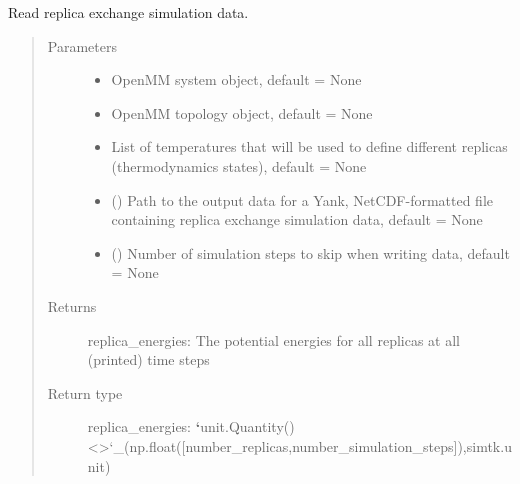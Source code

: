 \documentclass[letterpaper,12pt,english,openany,oneside]{sphinxmanual}
\begin{document}
\begin{fulllineitems}
\label{\detokenize{simulation:simulation.rep_exch.read_replica_exchange_data}}
Read replica exchange simulation data.
\begin{quote}\begin{description}
\item[{Parameters}] \leavevmode\begin{itemize}
\item {} 
 \textendash{} OpenMM system object, default = None

\item {} 
 \textendash{} OpenMM topology object, default = None

\item {} 
 \textendash{} List of temperatures that will be used to define different replicas (thermodynamics states), default = None

\item {} 
 () \textendash{} Path to the output data for a Yank, NetCDF-formatted file containing replica exchange simulation data, default = None

\item {} 
 () \textendash{} Number of simulation steps to skip when writing data, default = None

\end{itemize}

\item[{Returns}] \leavevmode
replica\_energies: The potential energies for all replicas at all (printed) time steps

\item[{Return type}] \leavevmode
replica\_energies: {\color{red}\bfseries{}{}`}unit.Quantity() \textless{}\textgreater{}{}`\_(np.float({[}number\_replicas,number\_simulation\_steps{]}),simtk.unit)


\end{description}
\end{quote}
\end{fulllineitems}
\end{document}
